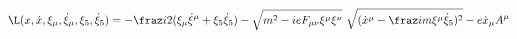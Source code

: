 \begin{equation}
\L(x,\dot x,\xi_\mu,{\dot \xi}_\mu,\xi_5,{\dot \xi}_5)=-\fraz i2
(\xi_\mu{\dot \xi}^\mu+ \xi_5{\dot \xi}_5)-\sqrt{m^2
-ieF_{\mu\nu}\xi^\mu\xi^\nu}~ \sqrt{({\dot x}^\mu-\fraz im
\xi^\mu{\dot\xi}_5)^2} -e{\dot x}_\mu A^\mu \label{spinlagrangian}
\end{equation}

